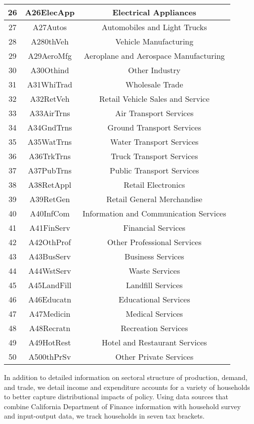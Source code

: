 \documentclass{article}
\begin{document}
\begin{center}
\begin{footnotesize}
\begin{tabular}{|c|c|c|}
\hline 26 & A26ElecApp & Electrical Appliances \\
\hline 27 & A27Autos & Automobiles and Light Trucks \\
\hline 28 & A280thVeh & Vehicle Manufacturing \\
\hline 29 & A29AeroMfg & Aeroplane and Aerospace Manufacturing \\
\hline 30 & A30Othind & Other Industry \\
\hline 31 & A31WhiTrad & Wholesale Trade \\
\hline 32 & A32RetVeh & Retail Vehicle Sales and Service \\
\hline 33 & A33AirTrns & Air Transport Services \\
\hline 34 & A34GndTrns & Ground Transport Services \\
\hline 35 & A35WatTrns & Water Transport Services \\
\hline 36 & A36TrkTrns & Truck Transport Services \\
\hline 37 & A37PubTrns & Public Transport Services \\
\hline 38 & A38RetAppl & Retail Electronics \\
\hline 39 & A39RetGen & Retail General Merchandise \\
\hline 40 & A40InfCom & Information and Communication Services \\
\hline 41 & A41FinServ & Financial Services \\
\hline 42 & A42OthProf & Other Professional Services \\
\hline 43 & A43BusServ & Business Services \\
\hline 44 & A44WstServ & Waste Services \\
\hline 45 & A45LandFill & Landfill Services \\
\hline 46 & A46Educatn & Educational Services \\
\hline 47 & A47Medicin & Medical Services \\
\hline 48 & A48Recratn & Recreation Services \\
\hline 49 & A49HotRest & Hotel and Restaurant Services \\
\hline 50 & A500thPrSv & Other Private Services \\
\hline
\end{tabular}
\end{footnotesize}
\end{center}

\newpage

In addition to detailed information on sectoral structure of production, demand, and trade, we detail income and expenditure accounts for a variety of households to better capture distributional impacts of policy. Using data sources that combine California Department of Finance information with household survey and input-output data, we track households in seven tax brackets.
\end{document}
